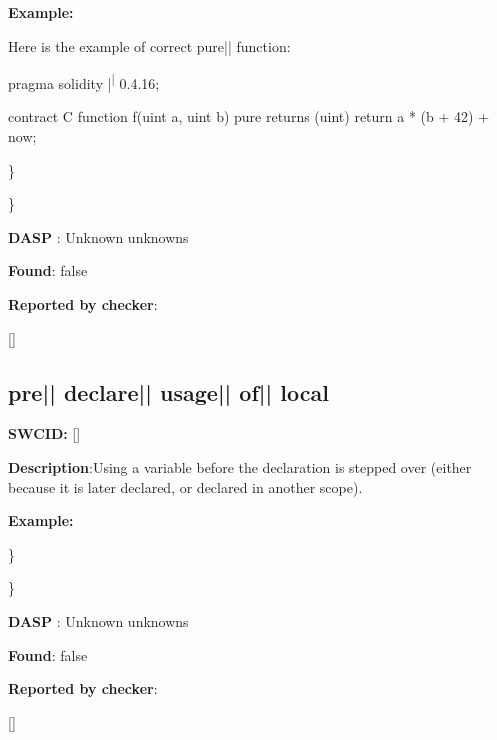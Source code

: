 \documentclass{article}
\begin{document}
\textbf{Example:} 
\begin{ffcode} 

Here is the example of correct pure|\textendash| function:

pragma solidity |\textsuperscript| 0.4.16;

contract C {
    function f(uint a, uint b) pure returns (uint) {
        return a * (b + 42) + now;
    }
}

\end{ffcode} 
\} 

\} 

\textbf{DASP} : Unknown unknowns

\textbf{Found}: false

\textbf{Reported by checker}: 
\begin{ffcode} 

[]
\end{ffcode} 
\subsection{pre{|\textunderscore| }declare{|\textunderscore| }usage{|\textunderscore| }of{|\textunderscore| }local} 
\textbf{SWC{\textunderscore }ID:} []

\textbf{Description}:Using a variable before the declaration is stepped over (either because it is later declared, or declared in another scope).


\textbf{Example:} 
\} 

\} 

\textbf{DASP} : Unknown unknowns

\textbf{Found}: false

\textbf{Reported by checker}: 
\begin{ffcode} 

[]
\end{ffcode} 
\end{document}
